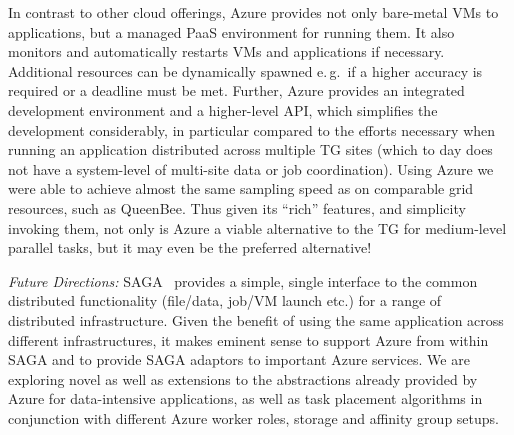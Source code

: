 \documentclass[conference,final]{IEEEtran}
\newcommand{\alnote}[1]{ {\textcolor{blue} { ***AL: #1 }}}
\newcommand{\jhanote}[1]{ {\textcolor{red} { ***SJ: #1 }}}
\newcommand{\alnote}[1]{}
\newcommand{\jhanote}[1]{}
\begin{document}
In contrast to other cloud offerings, Azure provides not only
bare-metal VMs to applications, but a managed PaaS environment for
running them. It also monitors and automatically restarts VMs and
applications if necessary. Additional resources can be dynamically
spawned e.\,g.\ if a higher accuracy is required or a deadline must be
met. Further, Azure provides an integrated development environment and
a higher-level API, which simplifies the development considerably, in
particular compared to the efforts necessary when running an
application distributed across multiple TG sites (which to day
does not have a system-level of multi-site data or job
coordination). Using Azure we were able to achieve almost the same
sampling speed as on comparable grid resources, such as QueenBee.
Thus given its ``rich'' features, and simplicity invoking them, not
only is Azure a viable alternative to the TG for medium-level parallel
tasks, but it may even be the preferred alternative!

{\it Future Directions:} SAGA~\cite{saga_url} provides a simple,
single interface to the common distributed functionality (file/data,
job/VM launch etc.) for a range of distributed infrastructure.  Given
the benefit of using the same application across different
infrastructures, it makes eminent sense to support Azure from within
SAGA and to provide SAGA adaptors to important Azure services. %
We are exploring novel as well as extensions to the abstractions
already provided by Azure for data-intensive applications, as well as
task placement algorithms in conjunction with different Azure worker
roles, storage and affinity group setups.
  
  
\end{document}
